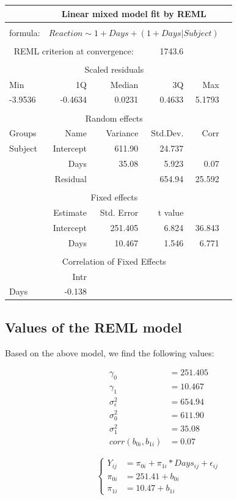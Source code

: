 \documentclass[
]{article}
\begin{document}
\begin{longtable}[]{@{}lrrrrr@{}}
\toprule
 & \multicolumn{4}{c}{Linear mixed model fit by REML} \tabularnewline
\midrule
\tabularnewline
formula: & \multicolumn{4}{c}{$Reaction \sim 1 + Days + (1 + Days | Subject)$} \tabularnewline
\tabularnewline
\multicolumn{3}{c}{REML criterion at convergence:} & 1743.6 \tabularnewline
\tabularnewline
\multicolumn{5}{c}{Scaled residuals}\tabularnewline
\midrule
Min & 1Q & Median & 3Q & Max \tabularnewline
\midrule
-3.9536 & -0.4634 & 0.0231 & 0.4633 & 5.1793 \tabularnewline
\midrule
\tabularnewline
\multicolumn{5}{c}{Random effects}\tabularnewline
\midrule
Groups & Name & Variance & Std.Dev. & Corr \tabularnewline
\midrule
Subject & Intercept & 611.90 & 24.737 &        \tabularnewline
        & Days      & 35.08  & 5.923  & 0.07   \tabularnewline
        & Residual  &        & 654.94 & 25.592 \tabularnewline
\midrule
\tabularnewline
\multicolumn{5}{c}{Fixed effects}\tabularnewline
\midrule
        & Estimate  & Std. Error & t value &  \tabularnewline
\midrule
    & Intercept & 251.405 & 6.824 &  36.843 \tabularnewline
   & Days      & 10.467  & 1.546 & 6.771   \tabularnewline
\midrule
\tabularnewline
\multicolumn{5}{c}{Correlation of Fixed Effects}\tabularnewline
\midrule
& Intr \tabularnewline
\midrule
Days & -0.138 \tabularnewline
\bottomrule
\end{longtable} 

\pagebreak

\hypertarget{values-of-the-reml-model}{%
\subsection{Values of the REML model}\label{values-of-the-reml-model}}

Based on the above model, we find the following values:

\[\begin{aligned}
\gamma_{0}  &= 251.405 \\
\gamma_{1}  &= 10.467  \\
\sigma_{\epsilon}^{2} &= 654.94 \\
\sigma_{0}^{2} &= 611.90 \\
\sigma_{1}^{2} &= 35.08 \\
corr(b_{0i}, b_{1i}) &= 0.07
\end{aligned}\]

\[
\begin{cases}
Y_{ij}   &= \pi_{0i} + \pi_{1i}* Days_{ij} + \epsilon_{ij} \\
\pi_{0i} &= 251.41 + b_{0i} \\
\pi_{1i} &= 10.47 + b_{1i}
\end{cases}
\]
\end{document}
